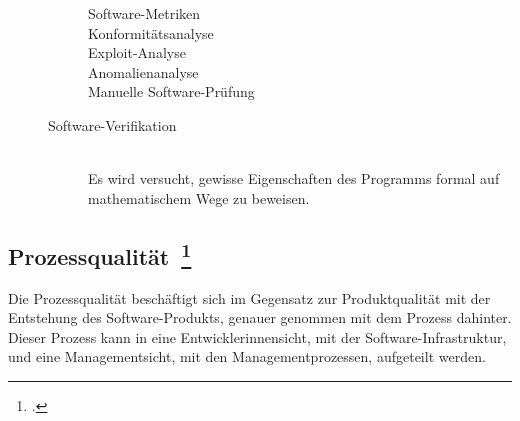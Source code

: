 \begin{description}
\begin{description}
\begin{description}
      \item[Software-Metriken] \hfill 
      \item[Konformitätsanalyse] \hfill 
      \item[Exploit-Analyse] \hfill 
      \item[Anomalienanalyse] \hfill 
      \item[Manuelle Software-Prüfung] \hfill 
    \end{description}
    \item[Software-Verifikation] \hfill \\ Es wird versucht, gewisse Eigenschaften des Programms formal auf mathematischem Wege zu beweisen.
  \end{description}
\end{description}

\clearpage
\subsection[Prozessqualität]{Prozessqualität~\footcite[vgl.][Kapitel 1.4.2]{hoffmann_software_qualitat_2013}}

Die Prozessqualität beschäftigt sich im Gegensatz zur Produktqualität mit der Entstehung des Software-Produkts, genauer genommen mit dem Prozess dahinter.
Dieser Prozess kann in eine Entwicklerinnensicht, mit der Software-Infrastruktur, und eine Managementsicht, mit den Managementprozessen, aufgeteilt werden.

